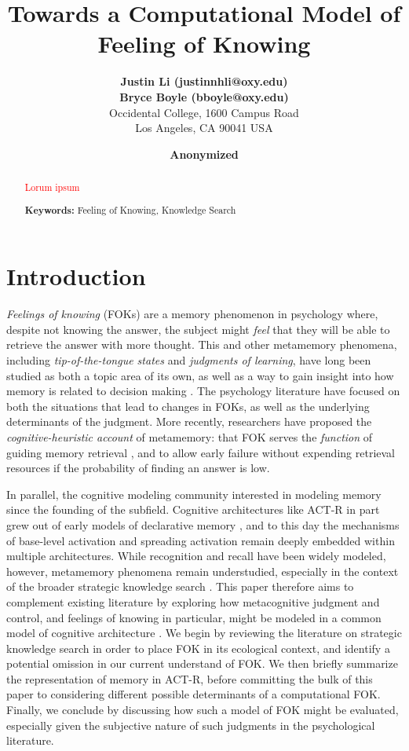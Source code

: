 \documentclass[10pt,letterpaper]{article}
\author{
        {\large \bf Justin Li (justinnhli@oxy.edu)} \\
        {\large \bf Bryce Boyle (bboyle@oxy.edu)} \\
        Occidental College, 1600 Campus Road \\
        Los Angeles, CA 90041 USA
    }
\title{Towards a Computational Model of Feeling of Knowing}
\author{
    {\large \bf Anonymized}
}
\newcommand{\fixme}[2][]{#2}
\renewcommand{\fixme}[2][]{\textcolor{red}{#2}}
\begin{document}
\maketitle

\begin{abstract}

    \fixme{Lorum ipsum}

    \textbf{Keywords:} Feeling of Knowing, Knowledge Search

\end{abstract}

\section{Introduction}

\emph{Feelings of knowing} (FOKs) are a memory phenomenon in psychology where, despite not knowing the answer, the subject might \emph{feel} that they will be able to retrieve the answer with more thought.
This and other metamemory phenomena, including \emph{tip-of-the-tongue states} and \emph{judgments of learning}, have long been studied as both a topic area of its own, as well as a way to gain insight into how memory is related to decision making \cite{Nelson1994WhyInvestigateMetacognition}.
The psychology literature have focused on both the situations that lead to changes in FOKs, as well as the underlying determinants of the judgment.
More recently, researchers have proposed the \emph{cognitive-heuristic account} of metamemory: that FOK serves the \emph{function} of guiding memory retrieval \cite{Schwartz2011TipOfThe}, and to allow early failure without expending retrieval resources if the probability of finding an answer is low.

In parallel, the cognitive modeling community interested in modeling memory since the founding of the subfield.
Cognitive architectures like ACT-R \cite{Anderson2007HowCanThe} in part grew out of early models of declarative memory \cite{Anderson1983ASpreadingActivation, Anderson1991ReflectionsOfThe}, and to this day the mechanisms of base-level activation and spreading activation remain deeply embedded within multiple architectures.
While recognition and recall have been widely modeled, however, metamemory phenomena remain understudied, especially in the context of the broader strategic knowledge search \cite{Newell1972HumanProblemSolving}.
This paper therefore aims to complement existing literature by exploring how metacognitive judgment and control, and feelings of knowing in particular, might be modeled in a common model of cognitive architecture \cite{Laird2017AStandardModel}.
We begin by reviewing the literature on strategic knowledge search in order to place FOK in its ecological context, and identify a potential omission in our current understand of FOK.
We then briefly summarize the representation of memory in ACT-R, before committing the bulk of this paper to considering different possible determinants of a computational FOK.
Finally, we conclude by discussing how such a model of FOK might be evaluated, especially given the subjective nature of such judgments in the psychological literature.
\end{document}
